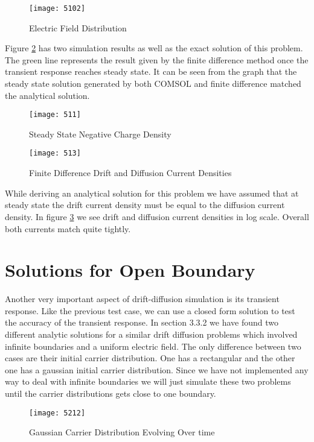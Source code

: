 \begin{figure}
\centering
\texttt{[image: 5102]}
\caption{Electric Field Distribution} 
\label{5E}
\end{figure}

\clearpage

Figure  \ref{5ss} has two simulation results as well as the exact solution of this problem. The green line represents the result given by the finite difference method once the transient response reaches steady state. It can be seen from the graph that the steady state solution generated by both COMSOL and finite difference matched the analytical solution.

\begin{figure}
\centering
\texttt{[image: 511]}
\caption{Steady State Negative Charge Density} 
\label{5ss}
\end{figure}

\begin{figure}[!htp]
\centering
\texttt{[image: 513]}
\caption{Finite Difference Drift and Diffusion Current Densities}
 \label{5curdens}
\end{figure}

While deriving an analytical solution for this problem we have assumed that at steady state the drift current density must be equal to the diffusion current density. In figure \ref{5curdens} we see drift and diffusion current densities in log scale. Overall both currents match quite tightly.

\clearpage
\section{Solutions for Open Boundary}
Another very important aspect of drift-diffusion simulation is its transient response. Like the previous test case, we can use a closed form solution to test the accuracy of the transient response. In section 3.3.2 we have found two different analytic solutions for a similar drift diffusion problems which involved infinite boundaries and a uniform electric field. The only difference between two cases are their initial carrier distribution. One has a rectangular and the other one has a gaussian  initial carrier distribution. Since we have not implemented any way to deal with infinite boundaries we will just simulate these two problems until the carrier distributions gets close to one boundary.  

\begin{figure}[ht]
\centering
\texttt{[image: 5212]}
\caption{Gaussian Carrier Distribution Evolving Over time} 
\label{51}
\end{figure}


